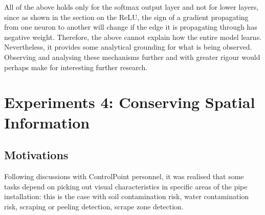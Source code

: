 \documentclass[a4paper,11pt]{article}
\begin{document}
All of the above holds only for the softmax output layer and not for lower layers, since as shown in the section on the ReLU, the sign of a gradient propagating from one neuron to another will change if the edge it is propagating through has negative weight. Therefore, the above cannot explain how the entire model learns. Nevertheless, it provides some analytical grounding for what is being observed. Observing and analysing these mechanisms further and with greater rigour would perhaps make for interesting further research.

%
%




\section{Experiments 4: Conserving Spatial Information}

\subsection{Motivations}

Following discussions with ControlPoint personnel, it was realised that some tasks depend on picking out visual characteristics in specific areas of the pipe installation: this is the case with soil contamination risk, water contamination risk, scraping or peeling detection, scrape zone detection.
\end{document}

